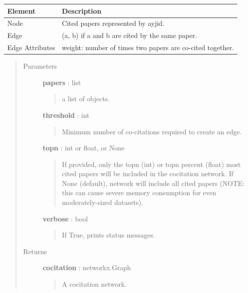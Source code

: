 \documentclass[letterpaper,10pt,english]{sphinxmanual}
\begin{document}
\begin{fulllineitems}
\begin{tabulary}{\linewidth}{|L|L|}
\hline
\textbf{
Element
} & \textbf{
Description
}\\\hline

Node
 & 
Cited papers represented by {\hyperref[tethne:tethne.data.Paper]{}} ayjid.
\\\hline

Edge
 & 
(a, b) if a and b are cited by the same paper.
\\\hline

Edge Attributes
 & 
weight: number of times two papers are co-cited
together.
\\\hline
\end{tabulary}

\begin{quote}\begin{description}
\item[{Parameters }] \leavevmode
\textbf{papers} : list
\begin{quote}

a list of {\hyperref[tethne:tethne.data.Paper]{}} objects.
\end{quote}

\textbf{threshold} : int
\begin{quote}

Minimum number of co-citations required to create an edge.
\end{quote}

\textbf{topn} : int or float, or None
\begin{quote}

If provided, only the topn (int) or topn percent (float) most cited
papers will be included in the cocitation network. If None (default),
network will include all cited papers (NOTE: this can cause severe
memory consumption for even moderately-sized datasets).
\end{quote}

\textbf{verbose} : bool
\begin{quote}

If True, prints status messages.
\end{quote}

\item[{Returns }] \leavevmode
\textbf{cocitation} : networkx.Graph
\begin{quote}

A cocitation network.
\end{quote}

\end{description}\end{quote}

\end{fulllineitems}
\end{document}
